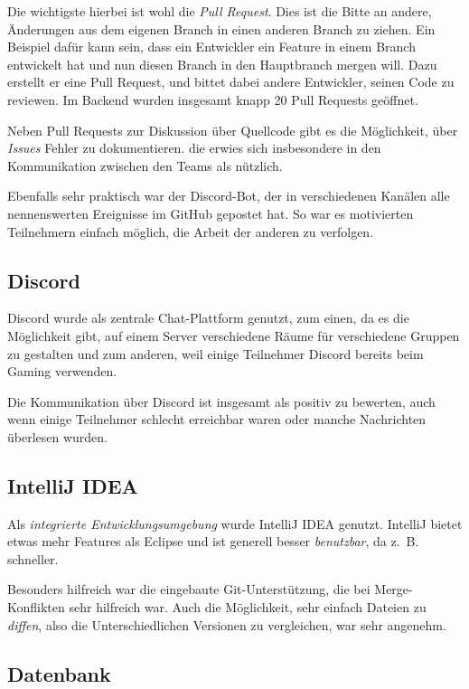 \documentclass[a4paper, 11pt]{article}
\begin{document}
Die wichtigste hierbei ist wohl die \emph{Pull Request}. Dies ist die Bitte an
andere, Änderungen aus dem eigenen Branch in einen anderen Branch zu ziehen.
Ein Beispiel dafür kann sein, dass ein Entwickler ein Feature in einem Branch
entwickelt hat und nun diesen Branch in den Hauptbranch mergen will. Dazu
erstellt er eine Pull Request, und bittet dabei andere Entwickler, seinen Code
zu reviewen. Im Backend wurden insgesamt knapp 20 Pull Requests geöffnet.
 
Neben Pull Requests zur Diskussion über Quellcode gibt es die Möglichkeit, über
\emph{Issues} Fehler zu dokumentieren. die erwies sich insbesondere in den
Kommunikation zwischen den Teams als nützlich.

Ebenfalls sehr praktisch war der Discord-Bot, der in verschiedenen Kanälen alle nennenswerten Ereignisse im GitHub gepostet hat. So war es motivierten Teilnehmern einfach möglich, die Arbeit der anderen zu verfolgen.

\subsection{Discord}

Discord wurde als zentrale Chat-Plattform genutzt, zum einen, da es die
Möglichkeit gibt, auf einem Server verschiedene Räume für verschiedene Gruppen
zu gestalten und zum anderen, weil einige Teilnehmer Discord bereits beim
Gaming verwenden.

Die Kommunikation über Discord ist insgesamt als positiv zu bewerten, auch wenn
einige Teilnehmer schlecht erreichbar waren oder manche Nachrichten überlesen
wurden.

\subsection{IntelliJ IDEA}

Als \emph{integrierte Entwicklungsumgebung} wurde IntelliJ IDEA genutzt.
IntelliJ bietet etwas mehr Features als Eclipse und ist generell besser
\emph{benutzbar}, da z.~B. schneller.

Besonders hilfreich war die eingebaute Git-Unterstützung, die bei
Merge-Konflikten sehr hilfreich war. Auch die Möglichkeit, sehr einfach Dateien
zu \emph{diffen}, also die Unterschiedlichen Versionen zu vergleichen, war sehr
angenehm.

\subsection{Datenbank}
\end{document}
